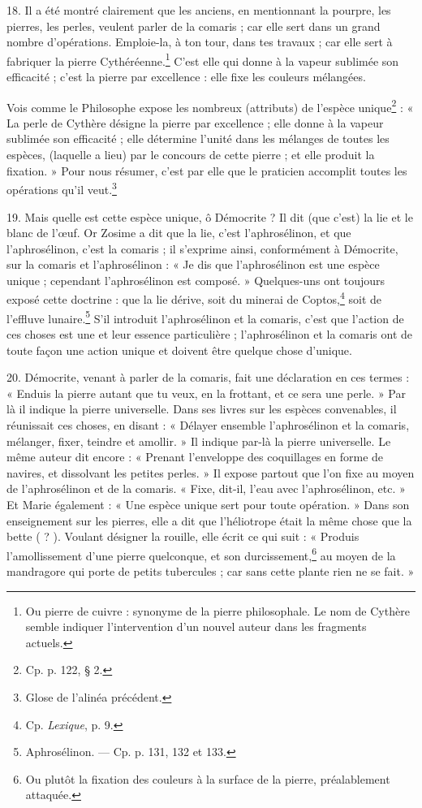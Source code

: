 \documentclass[a4paper, 11pt, oneside, polutonikogreek, french]{article}
\begin{document}
18. Il a été montré clairement que les anciens, en mentionnant la pourpre, les pierres, les perles, veulent parler de la comaris ; car elle sert dans un grand nombre d'opérations. Emploie-la, à ton tour, dans tes travaux ; car elle sert à fabriquer la pierre Cythéréenne.\footnote{Ou pierre de cuivre : synonyme de la pierre philosophale. Le nom de Cythère semble indiquer l'intervention d'un nouvel auteur dans les fragments actuels.} C'est elle qui donne à la vapeur sublimée son efficacité ; c'est la pierre par excellence : elle fixe les couleurs mélangées.

Vois comme le Philosophe expose les nombreux (attributs) de l'espèce unique\footnote{Cp. p. 122, § 2.} : « La perle de Cythère désigne la pierre par excellence ; elle donne à la vapeur sublimée son efficacité ; elle détermine l'unité dans les mélanges de toutes les espèces, (laquelle a lieu) par le concours de cette pierre ; et elle produit la fixation. » Pour nous résumer, c'est par elle que le praticien accomplit toutes les opérations qu'il veut.\footnote{Glose de l'alinéa précédent.}

19. Mais quelle est cette espèce unique, ô Démocrite ? Il dit (que c'est) la lie et le blanc de l'œuf. Or Zosime a dit que la lie, c'est l'aphrosélinon, et que l'aphrosélinon, c'est la comaris ; il s'exprime ainsi, conformément à Démocrite, sur la comaris et l'aphrosélinon : « Je dis que l'aphrosélinon est une espèce unique ; cependant l'aphrosélinon est composé. » Quelques-uns ont toujours exposé cette doctrine : que la lie dérive, soit du minerai de Coptos,\footnote{Cp. \emph{Lexique}, p. 9.} soit de l'effluve lunaire.\footnote{Aphrosélinon. --- Cp. p. 131, 132 et 133.} S'il introduit l'aphrosélinon et la comaris, c'est que l'action de ces choses est une et leur essence particulière ; l'aphrosélinon et la comaris ont de toute façon une action unique et doivent être quelque chose d'unique.

20. Démocrite, venant à parler de la comaris, fait une déclaration en ces termes : « Enduis la pierre autant que tu veux, en la frottant, et ce sera une perle. » Par là il indique la pierre universelle. Dans ses livres sur les espèces convenables, il réunissait ces choses, en disant : « Délayer ensemble l'aphrosélinon et la comaris, mélanger, fixer, teindre et amollir. » Il indique par-là la pierre universelle. Le même auteur dit encore : « Prenant l'enveloppe des coquillages en forme de navires, et dissolvant les petites perles. » Il expose partout que l'on fixe au moyen de l'aphrosélinon et de la comaris. « Fixe, dit-il, l'eau avec l'aphrosélinon, etc. » Et Marie également : « Une espèce unique sert pour toute opération. » Dans son enseignement sur les pierres, elle a dit que l'héliotrope était la même chose que la bette ( ? ). Voulant désigner la rouille, elle écrit ce qui suit : « Produis l'amollissement d'une pierre quelconque, et son durcissement,\footnote{Ou plutôt la fixation des couleurs à la surface de la pierre, préalablement attaquée.} au moyen de la mandragore qui porte de petits tubercules ; car sans cette plante rien ne se fait. »
\end{document}
